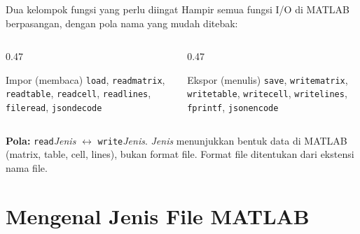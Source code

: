 \documentclass[10pt,aspectratio=169]{beamer}
\newcommand{\kode}[1]{\texttt{\small #1}}
\begin{document}
\begin{frame}{Dua kelompok fungsi yang perlu diingat}
  Hampir semua fungsi I/O di MATLAB berpasangan, dengan pola nama yang mudah ditebak:

  \vspace{0.6em}
  \begin{columns}[T]
    \begin{column}{0.47\textwidth}
      \begin{block}{Impor (membaca)}
        \kode{load}, \kode{readmatrix}, \kode{readtable}, \kode{readcell}, \kode{readlines}, \kode{fileread}, \kode{jsondecode}
      \end{block}
    \end{column}
    \begin{column}{0.47\textwidth}
      \begin{alertblock}{Ekspor (menulis)}
        \kode{save}, \kode{writematrix}, \kode{writetable}, \kode{writecell}, \kode{writelines}, \kode{fprintf}, \kode{jsonencode}
      \end{alertblock}
    \end{column}
  \end{columns}

  \vspace{0.8em}
  \textbf{Pola:} \kode{read}\textit{Jenis} $\leftrightarrow$ \kode{write}\textit{Jenis}.
  \textit{Jenis} menunjukkan \alert{bentuk data di MATLAB} (matrix, table, cell, lines), bukan format file.
  Format file ditentukan dari \alert{ekstensi} nama file.
\end{frame}

\section{Mengenal Jenis File MATLAB}
\end{document}
